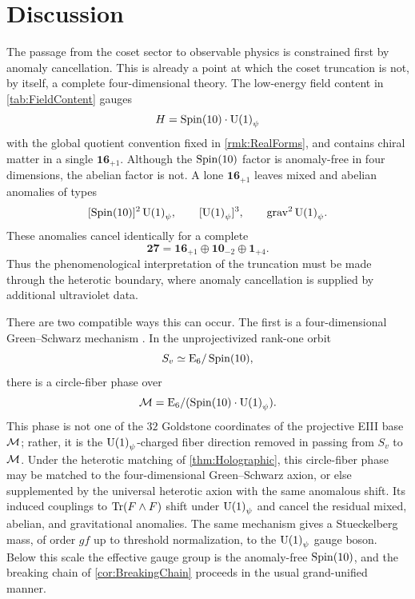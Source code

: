 \documentclass[pdflatex,sn-mathphys-num]{sn-jnl}
\theoremstyle{thmstyleone}
\theoremstyle{thmstylethree}%
\theoremstyle{thmstyletwo}%
\begin{document}
\section{Discussion}
\label{sec:Discussion}

The passage from the coset sector to observable physics is constrained first by
anomaly cancellation. This is already a point at which the coset truncation is
not, by itself, a complete four-dimensional theory. The low-energy field content
in \autoref{tab:FieldContent} gauges
\[
  H=\operatorname{Spin}(10)\cdot \mathrm{U(1)}_{\psi}
\]
with the global quotient convention fixed in \autoref{rmk:RealForms}, and
contains chiral matter in a single \(\mathbf{16}_{+1}\). Although the
\(\operatorname{Spin}(10)\) factor is anomaly-free in four dimensions, the abelian factor is
not. A lone \(\mathbf{16}_{+1}\) leaves mixed and abelian anomalies of types
\[
  [\operatorname{Spin}(10)]^2\,\mathrm{U(1)}_\psi,\qquad
  [\mathrm{U(1)}_\psi]^3,\qquad
  \mathrm{grav}^{2}\,\mathrm{U(1)}_\psi .
\]
These anomalies cancel identically for a complete
\[
  \mathbf{27}
  =
  \mathbf{16}_{+1}
  \oplus
  \mathbf{10}_{-2}
  \oplus
  \mathbf{1}_{+4}.
\]
Thus the phenomenological interpretation of the truncation must be made through
the heterotic boundary, where anomaly cancellation is supplied by additional
ultraviolet data.

There are two compatible ways this can occur. The first is a four-dimensional
Green--Schwarz mechanism \cite{GreenSchwarz:1984,DineSeibergWitten:1987}. In
the unprojectivized rank-one orbit
\[
  S_v\simeq \mathrm{E}_{6}/\operatorname{Spin}(10),
\]
there is a circle-fiber phase over
\[
  \mathcal{M}=\mathrm{E}_{6}/(\operatorname{Spin}(10)\cdot\mathrm{U(1)}_\psi).
\]
This phase is not one of the \(32\) Goldstone coordinates of the projective
EIII base \(\mathcal{M}\); rather, it is the \(\mathrm{U(1)}_\psi\)-charged fiber direction
removed in passing from \(S_v\) to \(\mathcal{M}\). Under the heterotic matching of
\autoref{thm:Holographic}, this circle-fiber phase may be matched to the
four-dimensional Green--Schwarz axion, or else supplemented by the universal
heterotic axion with the same anomalous shift. Its induced couplings to
\(\operatorname{Tr}(F\wedge F)\) shift under \(\mathrm{U(1)}_\psi\) and cancel the residual mixed,
abelian, and gravitational anomalies. The same mechanism gives a Stueckelberg
mass, of order \(g f\) up to threshold normalization, to the \(\mathrm{U(1)}_\psi\)
gauge boson. Below this scale the effective gauge group is the anomaly-free
\(\operatorname{Spin}(10)\), and the breaking chain of \autoref{cor:BreakingChain} proceeds in
the usual grand-unified manner.
\end{document}
